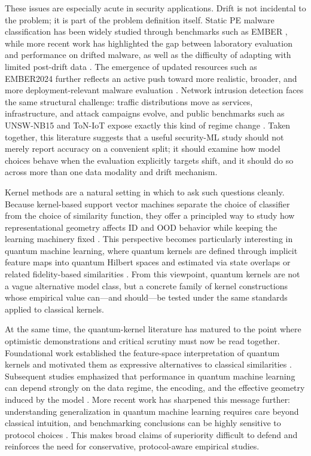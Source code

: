 \documentclass[journal]{IEEEtran}
\begin{document}
These issues are especially acute in security applications. Drift is not incidental to the problem; it is part of the problem definition itself. Static PE malware classification has been widely studied through benchmarks such as EMBER \cite{anderson2018ember}, while more recent work has highlighted the gap between laboratory evaluation and performance on drifted malware, as well as the difficulty of adapting with limited post-drift data \cite{barbero2022transcending,li2025revisitingdrift}. The emergence of updated resources such as EMBER2024 further reflects an active push toward more realistic, broader, and more deployment-relevant malware evaluation \cite{joyce2025ember2024}. Network intrusion detection faces the same structural challenge: traffic distributions move as services, infrastructure, and attack campaigns evolve, and public benchmarks such as UNSW-NB15 and ToN-IoT expose exactly this kind of regime change \cite{moustafa2015unsw,alsaedi2020toniot}. Taken together, this literature suggests that a useful security-ML study should not merely report accuracy on a convenient split; it should examine how model choices behave when the evaluation explicitly targets shift, and it should do so across more than one data modality and drift mechanism.

Kernel methods are a natural setting in which to ask such questions cleanly. Because kernel-based support vector machines separate the choice of classifier from the choice of similarity function, they offer a principled way to study how representational geometry affects ID and OOD behavior while keeping the learning machinery fixed \cite{cortes1995svm,scholkopf2002learningwithkernels}. This perspective becomes particularly interesting in quantum machine learning, where quantum kernels are defined through implicit feature maps into quantum Hilbert spaces and estimated via state overlaps or related fidelity-based similarities \cite{havlicek2019quantumenhanced,schuld2019featurehilbert,schuld2021kernelmethods}. From this viewpoint, quantum kernels are not a vague alternative model class, but a concrete family of kernel constructions whose empirical value can---and should---be tested under the same standards applied to classical kernels.

At the same time, the quantum-kernel literature has matured to the point where optimistic demonstrations and critical scrutiny must now be read together. Foundational work established the feature-space interpretation of quantum kernels and motivated them as expressive alternatives to classical similarities \cite{havlicek2019quantumenhanced,schuld2019featurehilbert}. Subsequent studies emphasized that performance in quantum machine learning can depend strongly on the data regime, the encoding, and the effective geometry induced by the model \cite{huang2021powerofdata,schuld2021encoding}. More recent work has sharpened this message further: understanding generalization in quantum machine learning requires care beyond classical intuition, and benchmarking conclusions can be highly sensitive to protocol choices \cite{gilfuster2024rethinkinggeneralization,bowles2024betterthanclassical,schnabel2025scrutiny}. This makes broad claims of superiority difficult to defend and reinforces the need for conservative, protocol-aware empirical studies.
\end{document}
